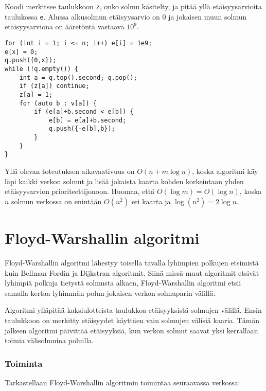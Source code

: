 Koodi merkitsee taulukkoon \texttt{z},
onko solmu käsitelty,
ja pitää yllä etäisyysarvioita taulukossa \texttt{e}.
Alussa alkusolmun etäisyysarvio on 0
ja jokaisen muun solmun etäisyysarviona
on ääretöntä vastaava $10^9$.

\begin{lstlisting}
for (int i = 1; i <= n; i++) e[i] = 1e9;
e[x] = 0;
q.push({0,x});
while (!q.empty()) {
    int a = q.top().second; q.pop();
    if (z[a]) continue;
    z[a] = 1;
    for (auto b : v[a]) {
        if (e[a]+b.second < e[b]) {
            e[b] = e[a]+b.second;
            q.push({-e[b],b});
        }
    }
}
\end{lstlisting}

Yllä olevan toteutuksen aikavaativuus on $O(n+m \log n)$,
koska algoritmi käy läpi kaikki verkon solmut
ja lisää jokaista kaarta kohden korkeintaan
yhden etäisyysarvion prioriteettijonoon.
Huomaa, että $O(\log m)=O(\log n)$, koska 
$n$ solmun verkossa on enintään $O(n^2)$ eri kaarta
ja $\log(n^2) = 2 \log n$.

\section{Floyd-Warshallin algoritmi}


Floyd-Warshallin algoritmi lähestyy toisella
tavalla lyhimpien polkujen etsimistä
kuin Bellman-Fordin ja Dijkstran algoritmit.
Siinä missä muut algoritmit
etsivät lyhimpiä polkuja
tietystä solmusta alkaen,
Floyd-Warshallin algoritmi etsii
samalla kertaa lyhimmän polun jokaisen verkon
solmuparin välillä.

Algoritmi ylläpitää kaksiulotteista
taulukkoa etäisyyksistä solmujen
välillä.
Ensin taulukkoon on merkitty
etäisyydet käyttäen vain solmujen
välisiä kaaria.
Tämän jälkeen algoritmi
päivittää etäisyyksiä,
kun verkon solmut saavat yksi kerrallaan
toimia välisolmuina poluilla.

\subsubsection{Toiminta}

Tarkastellaan Floyd-Warshallin
algoritmin toimintaa seuraavassa verkossa:

\begin{center}
\end{center}

